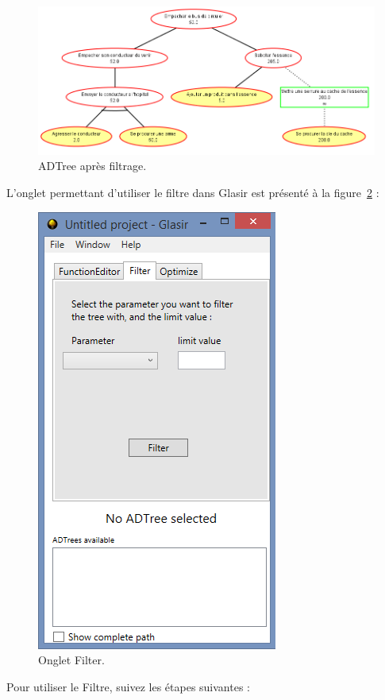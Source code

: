  \begin{figure}[H]
        \centering
        \hspace*{-1.2cm}
        \includegraphics[height=0.5\textwidth]{figure/arbreFiltre.png}
        \caption{ADTree après filtrage.}
        \label{fig:arbreFiltre}
    \end{figure}

L'onglet permettant d'utiliser le filtre dans Glasir est présenté à la {\sc figure}~\ref{fig:filter} :

 \begin{figure}[H]
        \centering
        \includegraphics[height=0.7\textwidth]{figure/filter.png}
        \caption{Onglet Filter.}
        \label{fig:filter}
    \end{figure}

Pour utiliser le Filtre, suivez les étapes suivantes :

